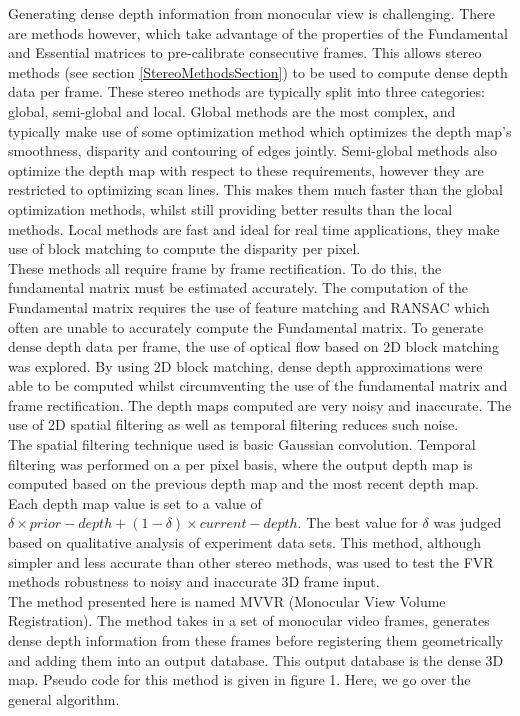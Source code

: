 Generating dense depth information from monocular view is challenging. There are methods however, which take advantage of the properties of the Fundamental and Essential matrices to pre-calibrate consecutive frames. This allows stereo methods (see section \ref{StereoMethodsSection}) to be used to compute dense depth data per frame. These stereo methods are typically split into three categories: global, semi-global and local. Global methods are the most complex, and typically make use of some optimization method which optimizes the depth map's smoothness, disparity and contouring of edges jointly. Semi-global methods also optimize the depth map with respect to these requirements, however they are restricted to optimizing scan lines. This makes them much faster than the global optimization methods, whilst still providing better results than the local methods. Local methods are fast and ideal for real time applications, they make use of block matching to compute the disparity per pixel. \\

These methods all require frame by frame rectification. To do this, the fundamental matrix must be estimated accurately. The computation of the Fundamental matrix requires the use of feature matching and RANSAC which often are unable to accurately compute the Fundamental matrix. To generate dense depth data per frame, the use of optical flow based on 2D block matching was explored. By using 2D block matching, dense depth approximations were able to be computed whilst circumventing the use of the fundamental matrix and frame rectification. The depth maps computed are very noisy and inaccurate. The use of 2D spatial filtering as well as temporal filtering reduces such noise. \\

The spatial filtering technique used is basic Gaussian convolution. Temporal filtering was performed on a per pixel basis, where the output depth map is computed based on the previous depth map and the most recent depth map. Each depth map value is set to a value of $\delta \times prior-depth + (1-\delta) \times current-depth$. The best value for $\delta$ was judged based on qualitative analysis of experiment data sets. This method, although simpler and less accurate than other stereo methods, was used to test the FVR methods robustness to noisy and inaccurate 3D frame input. \\

 

The method presented here is named MVVR (Monocular View Volume Registration). The method takes in a set of monocular video frames, generates dense depth information from these frames before registering them geometrically and adding them into an output database. This output database is the dense 3D map. Pseudo code for this method is given in figure 1. Here, we go over the general algorithm. \\

